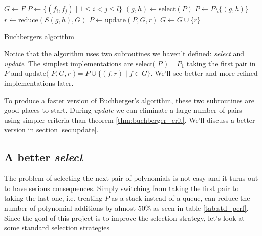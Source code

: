 \documentclass{article}
\theoremstyle{changedot}
\theoremstyle{changedotbreak}
\theoremstyle{nonumberplain}
\DeclarePairedDelimiter{\tuple}{\langle}{\rangle}
\begin{document}
\begin{algorithm}[H]
\DontPrintSemicolon

  $G \leftarrow F$ \;
  $P \leftarrow \{(f_{i}, f_{j}) \mid 1 \leq i < j \leq l\}$ \;
  {
    $(g, h) \leftarrow \text{select}(P)$ \;
    $P \leftarrow P \setminus \{(g, h)\}$ \;
    $r \leftarrow \text{reduce}(S(g, h), G)$ \;
    {
      $P \leftarrow \text{update}(P, G, r)$ \;
      $G \leftarrow G \cup \{r\}$ \;
    }
  }

\caption{Buchbergers algorithm}
\end{algorithm}

Notice that the algorithm uses two subroutines we haven't defined: \emph{select} and \emph{update}. The simplest implementations are $\text{select( $P$ )} = P_{1}$ taking the first pair in $P$ and $\text{update( $P, G, r$ )} = P \cup \{(f, r) \mid f \in G\}$. We'll see better and more refined implementations later.

To produce a faster version of Buchberger's algorithm, these two subroutines are good places to start. During \emph{update} we can eliminate a large number of pairs using simpler criteria than theorem \ref{thm:buchberger_crit}. We'll discuss a better version in section \ref{sec:update}.

\subsection{A better \emph{select}} \label{sec:select}

The problem of selecting the next pair of polynomials is not easy and it turns out to have serious consequences. Simply switching from taking the first pair to taking the last one, i.e. treating $P$ as a stack instead of a queue, can reduce the number of polynomial additions by almost 50\% as seen in table \ref{tab:std_perf}. Since the goal of this project is to improve the selection strategy, let's look at some standard selection strategies
\end{document}
